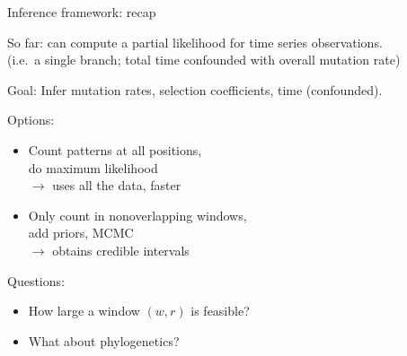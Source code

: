 \documentclass[smaller]{beamer}
\begin{document}
\begin{frame}{Inference framework: recap}

  {\struct So far:} 
  can compute a partial likelihood for time series observations. \\
  (i.e.\ a single branch; total time confounded with overall mutation rate)

  \vspace{1em}

  {\struct Goal:} 
  Infer mutation rates, selection coefficients, time (confounded).

  \vspace{1em}

  {\struct Options:} \\
  \begin{itemize}

    \item Count patterns at all positions, \\
      do maximum likelihood \\
      $\longrightarrow$ uses all the data, faster

    \item Only count in nonoverlapping windows, \\
      add priors, MCMC \\
      $\longrightarrow$ obtains credible intervals

  \end{itemize}

  {\struct Questions:} \\
  \begin{itemize}

    \item How large a window $(w,r)$ is feasible?

    \item What about phylogenetics?

  \end{itemize}
  

\end{frame}
\end{document}
